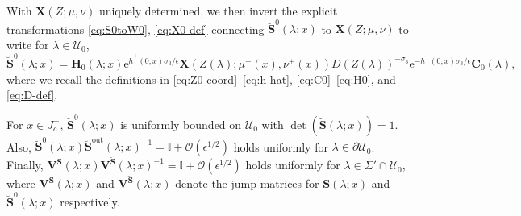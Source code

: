\documentclass[12pt]{amsart}
\numberwithin{equation}{section}
\newcommand{\ee}{\mathrm{e}}
\newcommand{\SP}{\lambda}
\newcommand{\eps}{\epsilon}
\newcommand{\bigo}[1]{ \mathcal{O}\! \left( #1 \right) }
\begin{document}
With $\mathbf{X}(Z;\mu,\nu)$ uniquely determined, we then invert the explicit transformations \eqref{eq:S0toW0}, \eqref{eq:X0-def} connecting $\breve{\mathbf{S}}^0(\SP;x)$ to $\mathbf{X}(Z;\mu,\nu)$ to write for $\SP\in\mathcal{U}_0$,
\begin{equation}
	\breve{\mathbf{S}}^0(\SP;x) =  
	\mathbf{H}_0(\SP ; x) \ee^{\hat{h}^+(0;x) \sigma_3/\eps} \mathbf{X}( Z(\SP) ; \mu^+(x), \nu^+(x)) D(Z(\SP))^{-\sigma_3} \ee^{-\hat{h}^+(0;x) \sigma_3/\eps} \mathbf{C}_0(\SP),
	\label{eq:S0fromX0}
\end{equation}
where we recall the definitions in \eqref{eq:Z0-coord}--\eqref{eq:h-hat}, \eqref{eq:C0}--\eqref{eq:H0}, and \eqref{eq:D-def}.


\begin{lem} For $x \in J^+_c$, 
	$\breve{\mathbf{S}}^0(\SP;x)$ is uniformly bounded on $\mathcal{U}_0$ with $\det( \breve{\mathbf{S}}(\SP;x)) = 1$. Also, 
	$\breve{\mathbf{S}}^0(\SP;x) \breve{\mathbf{S}}^{\mathrm{out}}(\SP;x)^{-1} = \mathbb{I} + \bigo{\eps^{1/2}}$ holds uniformly for $\lambda\in\partial \mathcal{U}_0$. Finally,  
	$\mathbf{V}^\mathbf{S}(\SP;x) \mathbf{V}^{\breve{\mathbf{S}}}(\SP;x)^{-1} = \mathbb{I} + \bigo{\eps^{1/2}}$ holds uniformly for $\SP \in \Sigma' \cap \mathcal{U}_0$, where $\mathbf{V^S}(\SP;x)$ and $\mathbf{V}^{\breve{\mathbf{S}}}(\SP;x)$ denote the jump matrices for $\mathbf{S}(\lambda;x)$ and $\breve{\mathbf{S}}^0(\lambda;x)$ respectively. 
\label{lem:approximate-jumps-active}
\end{lem}
\end{document}
